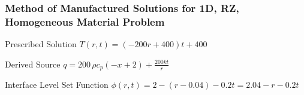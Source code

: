\documentclass[]{beamer}
\begin{document}
\begin{frame}[t]\frametitle{Method of Manufactured Solutions for 1D, RZ, Homogeneous Material Problem}
  \begin{block}{Prescribed Solution}
    $T(r,t) = (-200r+400)t + 400$
  \end{block}
  
  \begin{block}{Derived Source}
  $q = 200\,\rho c_p \left(-x+2\right) + \frac{200kt}{r}$
  \end{block}
  
  \begin{block}{Interface Level Set Function}
    $\phi(r,t) = 2 - (r - 0.04) - 0.2t = 2.04 - r - 0.2t$
  \end{block}
\end{frame}
\end{document}
